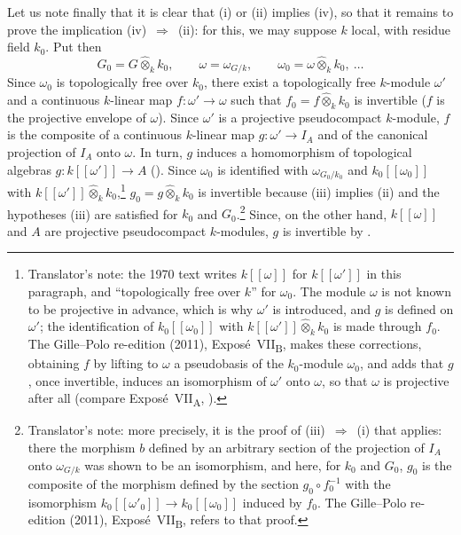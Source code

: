 \medskip
Let us note finally that it is clear that \textup{(i)} or \textup{(ii)} implies
\textup{(iv)}, so that it remains to prove the implication
\textup{(iv)}~\(\Rightarrow\)~\textup{(ii)}: for this, we may suppose \(k\) local,
with residue field \(k_0\). Put then
\[
  G_0=G\widehat\otimes_kk_0,
  \qquad
  \omega=\omega_{G/k},
  \qquad
  \omega_0=\omega\widehat\otimes_kk_0,\ \ldots
\]
Since \(\omega_0\) is topologically free over \(k_0\), there exist a
topologically free \(k\)-module \(\omega'\) and a continuous \(k\)-linear
map \(f:\omega'\to\omega\) such that \(f_0=f\widehat\otimes_kk_0\) is
invertible \textup{(}\(f\) is the projective envelope of \(\omega\)\textup{)}. Since
\(\omega'\) is a projective pseudocompact \(k\)-module, \(f\) is the
composite of a continuous \(k\)-linear map \(g:\omega'\to I_A\) and of the
canonical projection of \(I_A\) onto \(\omega\). In turn, \(g\) induces a
homomorphism of topological algebras \(g:k[[\omega']]\to A\)
\textup{()}. Since \(\omega_0\) is identified with
\(\omega_{G_0/k_0}\) and \(k_0[[\omega_0]]\) with
\(k[[\omega']]\widehat\otimes_kk_0\),\footnote{Translator's note: the 1970 text writes
\(k[[\omega]]\) for \(k[[\omega']]\) in this paragraph, and ``topologically free over \(k\)'' for \(\omega_0\).
The module \(\omega\) is not known to be projective in advance, which is why \(\omega'\) is introduced, and
\(g\) is defined on \(\omega'\); the identification of \(k_0[[\omega_0]]\) with
\(k[[\omega']]\widehat\otimes_kk_0\) is made through \(f_0\). The Gille--Polo re-edition (2011),
Expos\'e~VII\textsubscript{B}, makes these corrections, obtaining \(f\) by lifting to \(\omega\) a pseudobasis
of the \(k_0\)-module \(\omega_0\), and adds that \(g\), once invertible, induces an isomorphism of \(\omega'\)
onto \(\omega\), so that \(\omega\) is projective after all (compare Expos\'e~VII\textsubscript{A},
).} \(g_0=g\widehat\otimes_kk_0\) is invertible
because \textup{(iii)} implies \textup{(ii)} and the hypotheses \textup{(iii)} are
satisfied for \(k_0\) and \(G_0\).\footnote{Translator's note: more precisely, it is the proof of
(iii)~\(\Rightarrow\)~(i) that applies: there the morphism \(b\) defined by an arbitrary section of the
projection of \(I_A\) onto \(\omega_{G/k}\) was shown to be an isomorphism, and here, for \(k_0\) and
\(G_0\), \(g_0\) is the composite of the morphism defined by the section \(g_0\circ f_0^{-1}\) with the
isomorphism \(k_0[[\omega'_0]]\to k_0[[\omega_0]]\) induced by \(f_0\). The Gille--Polo re-edition (2011),
Expos\'e~VII\textsubscript{B}, refers to that proof.} Since, on the other hand, \(k[[\omega]]\)
and \(A\) are projective pseudocompact \(k\)-modules, \(g\) is invertible by
.
